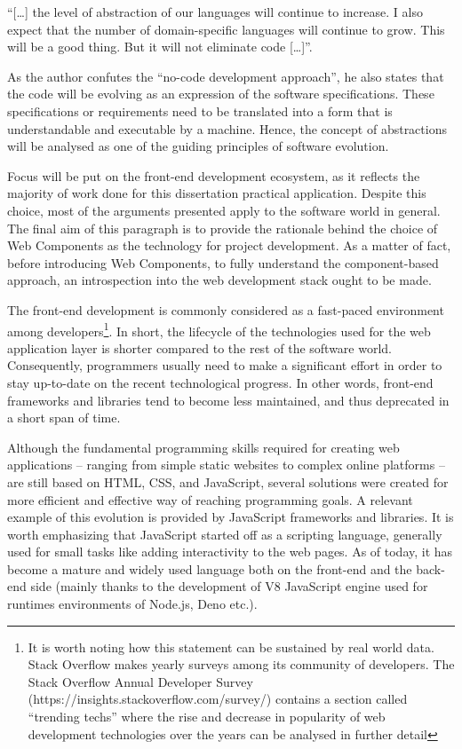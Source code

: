\begin{displayquote}

“[…] the level of abstraction of our languages will continue to increase. I also expect that the number of domain-specific languages will continue to grow. This will be a good thing. But it will not eliminate code […]”. 

\end{displayquote}

As the author confutes the “no-code development approach”, he also states that the code will be evolving as an expression of the software specifications. These specifications or requirements need to be translated into a form that is understandable and executable by a machine. Hence, the concept of abstractions will be analysed as one of the guiding principles of software evolution.

Focus will be put on the front-end development ecosystem, as it reflects the majority of work done for this dissertation practical application. Despite this choice, most of the arguments presented apply to the software world in general. The final aim of this paragraph is to provide the rationale behind the choice of Web Components as the technology for project development. As a matter of fact, before introducing Web Components, to fully understand the component-based approach, an introspection into the web development stack ought to be made.

The front-end development is commonly considered as a fast-paced environment among developers\footnote{It is worth noting how this statement can be sustained by real world data. Stack Overflow makes yearly surveys among its community of developers. The Stack Overflow Annual Developer Survey (https://insights.stackoverflow.com/survey/) contains a section called “trending techs” where the rise and decrease in popularity of web development technologies over the years can be analysed in further detail}. In short, the lifecycle of the technologies used for the web application layer is shorter compared to the rest of the software world. Consequently, programmers usually need to make a significant effort in order to stay up-to-date on the recent technological progress. In other words, front-end frameworks and libraries tend to become less maintained, and thus deprecated in a short span of time.

Although the fundamental programming skills required for creating web applications – ranging from simple static websites to complex online platforms – are still based on HTML, CSS, and JavaScript, several solutions were created for more efficient and effective way of reaching programming goals. A relevant example of this evolution is provided by JavaScript frameworks and libraries. It is worth emphasizing that JavaScript started off as a scripting language, generally used for small tasks like adding interactivity to the web pages. As of today, it has become a mature and widely used language both on the front-end and the back-end side (mainly thanks to the development of V8 JavaScript engine used for runtimes environments of Node.js, Deno etc.).

